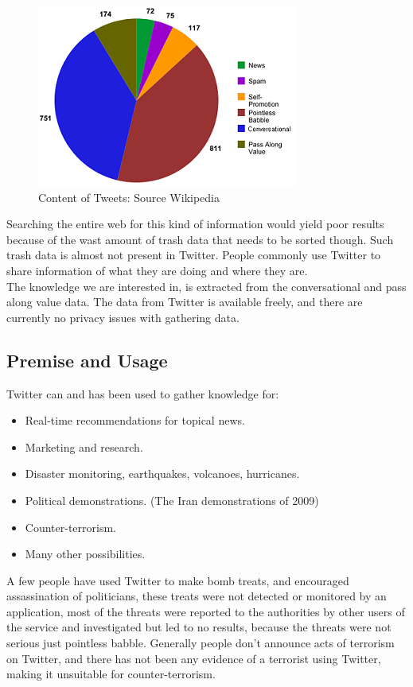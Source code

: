 \documentclass[]{article}  %
\begin{document}
\begin{figure}[h]
\centering
\includegraphics[scale=1]{Content_of_Tweets_Graphed.png}
\caption{Content of Tweets: Source Wikipedia}
\label{figContent}
\end{figure} 
Searching the entire web for this kind of information would yield poor results because of the wast amount of trash data that needs to be sorted though. Such trash data is almost not present in Twitter. People commonly use Twitter to share information of what they are doing and where they are. \\ The knowledge we are interested in, is extracted from the conversational and pass along value data. The data from Twitter is available freely, and there are currently no privacy issues with gathering data.

\subsection{Premise and Usage}
Twitter can and has been used to gather knowledge for:

\begin{itemize}
	\item Real-time recommendations for topical news. \cite{bib5}
	\item Marketing and research.
	\item Disaster monitoring, earthquakes, volcanoes, hurricanes. \cite{bib7}
	\item Political demonstrations. (The Iran demonstrations of 2009)
	\item Counter-terrorism.
	\item Many other possibilities.
\end{itemize}

A few people have used Twitter to make bomb treats, and encouraged assassination of politicians, these treats were not detected or monitored by an application, most of the threats were reported to the authorities by other users of the service and investigated but led to no results, because the threats were not serious just pointless babble. Generally people don't announce acts of terrorism on Twitter, and there has not been any evidence of a terrorist using Twitter, making it unsuitable for counter-terrorism.
\end{document}
